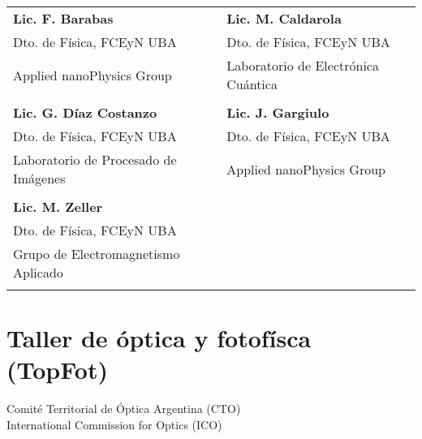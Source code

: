 \begin{center}

    \begin{tabular}{l l}
    \textbf{Lic. F. Barabas}        &   \textbf{Lic. M. Caldarola}        \\
    Dto. de F\'isica, FCEyN UBA       &   Dto. de F\'isica, FCEyN UBA           
\\
    Applied nanoPhysics Group       &   Laboratorio de Electr\'onica Cu\'antica
\\
    \hspace{1pt}                    &   \hspace{1pt} \\
    
    \textbf{Lic. G. D\'iaz Costanzo}         &   \textbf{Lic. J. Gargiulo}      
\\
    Dto. de F\'isica, FCEyN UBA               &   Dto. de F\'isica, FCEyN UBA   
  \\
    Laboratorio de Procesado de Im\'agenes    &   Applied nanoPhysics Group     
 \\
    \hspace{1pt}                            &   \hspace{1pt} \\
    
    \textbf{Lic. M. Zeller}                 &                   \\
    Dto. de F\'isica, FCEyN UBA               &                   \\
    Grupo de Electromagnetismo Aplicado     &                   \\
                                            &                   \\
    \end{tabular}

\end{center}
\vspace{2cm}


\newpage

\section{Taller de \'optica y fotof\'isca (TopFot)}

\begin{center}
Comit\'e Territorial de \'Optica Argentina (CTO) \\
International Commission for Optics (ICO) \\
\end{center}

